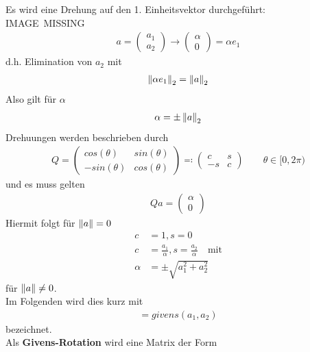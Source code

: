 Es wird eine Drehung auf den 1. Einheitsvektor durchgeführt:\\

IMAGE~MISSING\\

\begin{gather*}
a=\begin{pmatrix}a_1 \\ a_2\end{pmatrix} \rightarrow \begin{pmatrix}\alpha \\ 0 \end{pmatrix}
= \alpha e_1
\end{gather*}
d.h. Elimination von $a_2$ mit
\begin{gather*}
\left\| \alpha e_1 \right\|_2 = \left\| a \right\|_2
\end{gather*}
Also gilt für $\alpha$
\begin{gather*}
\alpha=\pm \left\| a \right\|_2
\end{gather*}
Drehuungen werden beschrieben durch
\begin{gather*}
Q = \begin{pmatrix}
cos(\theta) & sin(\theta)\\
-sin(\theta) & cos(\theta)
\end{pmatrix}
\eqqcolon \begin{pmatrix}
c & s\\
-s & c
\end{pmatrix}\qquad \theta \in[0,2\pi)
\end{gather*}
und es muss gelten
\begin{gather*}
Qa = \begin{pmatrix}\alpha \\ 0 \end{pmatrix}
\end{gather*}
Hiermit folgt für $\left\| a \right\|= 0$
\begin{align}
\nonumber
c&=1, s=0\\ \nonumber
c&=\frac{a_1}{\alpha},  s= \frac{a_2}{\alpha}\quad \text{mit}\\
\alpha & = \pm \sqrt{a_1^2+a_2^2}
\label{IV.4.4}
\end{align}
für $\left\| a \right\|\neq 0$.\\
Im Folgenden wird dies kurz mit
\begin{gather*}
[c,s] = givens(a_1, a_2)
\end{gather*}
bezeichnet. \\
Als \textbf{Givens-Rotation} wird eine Matrix der Form
